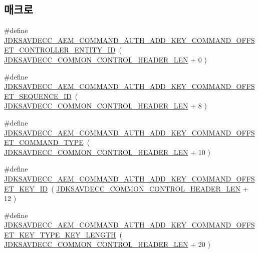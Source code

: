 \subsection*{매크로}
\begin{DoxyCompactItemize}
\item 
\#define \hyperlink{group__command__auth__add__key_gab2555626b6b26b238906f0bdce78faa5}{J\+D\+K\+S\+A\+V\+D\+E\+C\+C\+\_\+\+A\+E\+M\+\_\+\+C\+O\+M\+M\+A\+N\+D\+\_\+\+A\+U\+T\+H\+\_\+\+A\+D\+D\+\_\+\+K\+E\+Y\+\_\+\+C\+O\+M\+M\+A\+N\+D\+\_\+\+O\+F\+F\+S\+E\+T\+\_\+\+C\+O\+N\+T\+R\+O\+L\+L\+E\+R\+\_\+\+E\+N\+T\+I\+T\+Y\+\_\+\+ID}~( \hyperlink{group__jdksavdecc__avtp__common__control__header_gaae84052886fb1bb42f3bc5f85b741dff}{J\+D\+K\+S\+A\+V\+D\+E\+C\+C\+\_\+\+C\+O\+M\+M\+O\+N\+\_\+\+C\+O\+N\+T\+R\+O\+L\+\_\+\+H\+E\+A\+D\+E\+R\+\_\+\+L\+EN} + 0 )
\item 
\#define \hyperlink{group__command__auth__add__key_ga8d38ecbcea4902b7543f466c68eade6c}{J\+D\+K\+S\+A\+V\+D\+E\+C\+C\+\_\+\+A\+E\+M\+\_\+\+C\+O\+M\+M\+A\+N\+D\+\_\+\+A\+U\+T\+H\+\_\+\+A\+D\+D\+\_\+\+K\+E\+Y\+\_\+\+C\+O\+M\+M\+A\+N\+D\+\_\+\+O\+F\+F\+S\+E\+T\+\_\+\+S\+E\+Q\+U\+E\+N\+C\+E\+\_\+\+ID}~( \hyperlink{group__jdksavdecc__avtp__common__control__header_gaae84052886fb1bb42f3bc5f85b741dff}{J\+D\+K\+S\+A\+V\+D\+E\+C\+C\+\_\+\+C\+O\+M\+M\+O\+N\+\_\+\+C\+O\+N\+T\+R\+O\+L\+\_\+\+H\+E\+A\+D\+E\+R\+\_\+\+L\+EN} + 8 )
\item 
\#define \hyperlink{group__command__auth__add__key_gaec01e455cde370eff4889597e4265808}{J\+D\+K\+S\+A\+V\+D\+E\+C\+C\+\_\+\+A\+E\+M\+\_\+\+C\+O\+M\+M\+A\+N\+D\+\_\+\+A\+U\+T\+H\+\_\+\+A\+D\+D\+\_\+\+K\+E\+Y\+\_\+\+C\+O\+M\+M\+A\+N\+D\+\_\+\+O\+F\+F\+S\+E\+T\+\_\+\+C\+O\+M\+M\+A\+N\+D\+\_\+\+T\+Y\+PE}~( \hyperlink{group__jdksavdecc__avtp__common__control__header_gaae84052886fb1bb42f3bc5f85b741dff}{J\+D\+K\+S\+A\+V\+D\+E\+C\+C\+\_\+\+C\+O\+M\+M\+O\+N\+\_\+\+C\+O\+N\+T\+R\+O\+L\+\_\+\+H\+E\+A\+D\+E\+R\+\_\+\+L\+EN} + 10 )
\item 
\#define \hyperlink{group__command__auth__add__key_gab894fd638f59b1560709098ed56de4c4}{J\+D\+K\+S\+A\+V\+D\+E\+C\+C\+\_\+\+A\+E\+M\+\_\+\+C\+O\+M\+M\+A\+N\+D\+\_\+\+A\+U\+T\+H\+\_\+\+A\+D\+D\+\_\+\+K\+E\+Y\+\_\+\+C\+O\+M\+M\+A\+N\+D\+\_\+\+O\+F\+F\+S\+E\+T\+\_\+\+K\+E\+Y\+\_\+\+ID}~( \hyperlink{group__jdksavdecc__avtp__common__control__header_gaae84052886fb1bb42f3bc5f85b741dff}{J\+D\+K\+S\+A\+V\+D\+E\+C\+C\+\_\+\+C\+O\+M\+M\+O\+N\+\_\+\+C\+O\+N\+T\+R\+O\+L\+\_\+\+H\+E\+A\+D\+E\+R\+\_\+\+L\+EN} + 12 )
\item 
\#define \hyperlink{group__command__auth__add__key_ga1478144e2dbf8fa0a47cf46d915bdb4b}{J\+D\+K\+S\+A\+V\+D\+E\+C\+C\+\_\+\+A\+E\+M\+\_\+\+C\+O\+M\+M\+A\+N\+D\+\_\+\+A\+U\+T\+H\+\_\+\+A\+D\+D\+\_\+\+K\+E\+Y\+\_\+\+C\+O\+M\+M\+A\+N\+D\+\_\+\+O\+F\+F\+S\+E\+T\+\_\+\+K\+E\+Y\+\_\+\+T\+Y\+P\+E\+\_\+\+K\+E\+Y\+\_\+\+L\+E\+N\+G\+TH}~( \hyperlink{group__jdksavdecc__avtp__common__control__header_gaae84052886fb1bb42f3bc5f85b741dff}{J\+D\+K\+S\+A\+V\+D\+E\+C\+C\+\_\+\+C\+O\+M\+M\+O\+N\+\_\+\+C\+O\+N\+T\+R\+O\+L\+\_\+\+H\+E\+A\+D\+E\+R\+\_\+\+L\+EN} + 20 )

\end{DoxyCompactItemize}
